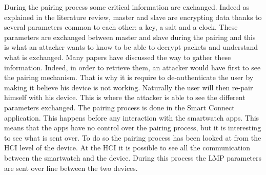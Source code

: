 During the pairing process some critical information are exchanged. Indeed as explained in the literature review, master and slave are encrypting data thanks to several parameters common to each other: a key, a salt and a clock. These parameters are exchanged between master and slave during the pairing and this is what an attacker wants to know to be able to decrypt packets and understand what is exchanged.
Many papers have discussed the way to gather these information. Indeed, in order to retrieve them, an attacker would have first to see the pairing mechanism. That is why it is require to de-authenticate the user by making it believe his device is not working. Naturally the user will then re-pair himself with his device. This is where the attacker is able to see the different parameters exchanged. 
The pairing process is done in the Smart Connect application. This happens before any interaction with the smartwatch apps. This means that the apps have no control over the pairing process, but it is interesting to see what is sent over. 
To do so the pairing process has been looked at from the HCI level of the device. At the HCI it is possible to see all the communication between the smartwatch and the device. During this process the LMP parameters are sent over line between the two devices. 
